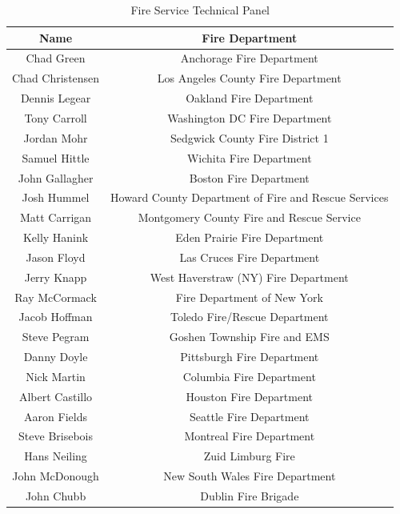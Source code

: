 \documentclass{article}
\begin{document}
\begin{center}
\begin{adjustwidth}{-0.25in}{-0.25in}
\begin{table}[H]
	\centering
	\begin{tabular}{|c|c|}
		\hline
		\bf{Name} & \bf{Fire Department} \\ \hline \hline
		Chad Green & Anchorage Fire Department \\ \hline
		Chad Christensen & Los Angeles County Fire Department \\ \hline
		Dennis Legear & Oakland Fire Department \\ \hline
		Tony Carroll & Washington DC Fire Department \\ \hline
		Jordan Mohr & Sedgwick County Fire District 1 \\ \hline
		Samuel Hittle & Wichita Fire Department \\ \hline
		John Gallagher & Boston Fire Department \\ \hline
		Josh Hummel & Howard County Department of Fire and Rescue Services \\ \hline
		Matt Carrigan & Montgomery County Fire and Rescue Service \\ \hline
		Kelly Hanink & Eden Prairie Fire Department \\ \hline
		Jason Floyd & Las Cruces Fire Department \\ \hline
		Jerry Knapp & West Haverstraw (NY) Fire Department \\ \hline
		Ray McCormack & Fire Department of New York \\ \hline
		Jacob Hoffman & Toledo Fire/Rescue Department \\ \hline
		Steve Pegram & Goshen Township Fire and EMS \\ \hline
		Danny Doyle & Pittsburgh Fire Department \\ \hline
		Nick Martin & Columbia Fire Department \\ \hline
		Albert Castillo & Houston Fire Department \\ \hline
		Aaron Fields & Seattle Fire Department \\ \hline
		Steve Brisebois & Montreal Fire Department \\ \hline
		Hans Neiling & Zuid Limburg Fire \\ \hline
		John McDonough & New South Wales Fire Department \\ \hline
		John Chubb & Dublin Fire Brigade \\ \hline		 		  
	\end{tabular}
	\caption*{Fire Service Technical Panel}
\end{table}

\end{adjustwidth}
\end{center}
\end{document}
